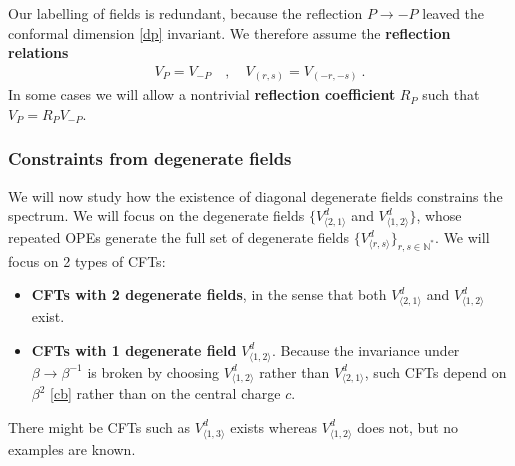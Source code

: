 \documentclass[12pt, a4paper]{article}
\newcommand{\myindex}[1]{\textbf{\boldmath #1}}
\begin{document}
Our labelling of fields is redundant, because the reflection $P\to -P$ leaved the conformal dimension \eqref{dp} invariant. We therefore assume the \myindex{reflection relations}
\begin{align}
 V_{P} = V_{-P} \quad , \quad V_{(r,s)} = V_{(-r,-s)} \ . 
 \label{refl}
\end{align}
In some cases we will allow a nontrivial \myindex{reflection coefficient} $R_P$ such that $V_P=R_P V_{-P}$. 


\subsubsection{Constraints from degenerate fields}\label{sec:dotc}

We will now study how the existence of diagonal degenerate fields constrains the spectrum. We will focus on the degenerate fields $\{V^d_{\langle 2,1\rangle}$ and $V^d_{\langle 1,2\rangle}\} $, whose repeated OPEs generate the full set of degenerate fields $\{V^d_{\langle r,s\rangle}\}_{r,s\in\mathbb{N}^*}$.  We will focus on 2 types of CFTs:
\begin{itemize}
 \item \myindex{CFTs with 2 degenerate fields}, in the sense that both $V^d_{\langle 2,1\rangle}$ and $V^d_{\langle 1,2\rangle}$ exist. 
 \item \myindex{CFTs with 1 degenerate field} $V^d_{\langle 1,2\rangle}$. Because the invariance under $\beta\to \beta^{-1}$ is broken by choosing $V^d_{\langle 1,2\rangle}$ rather than $V^d_{\langle 2,1\rangle}$, such CFTs depend on $\beta^2$ \eqref{cb} rather than on the central charge $c$. 
\end{itemize}
There might be CFTs such as $V^d_{\langle 1,3\rangle}$ exists whereas $V^d_{\langle 1,2\rangle}$ does not, but no examples are known.
\end{document}
